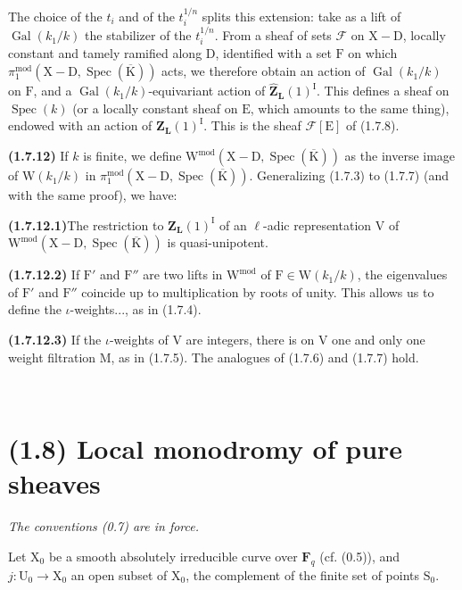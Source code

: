 \documentclass[11pt,leqno]{article}
\newcommand{\Page}[1]{\ifvmode\noindent\else\unskip\ \fi{\footnotesize\textcolor{gray}{[p.\,#1]}}\ \ignorespaces}
\begin{document}
The choice of the \(t_i\) and of the \(t_i^{1/n}\) splits this extension: take as a lift of \(\operatorname{Gal}(k_1/k)\) the stabilizer of the \(t_i^{1/n}\). From a sheaf of sets \(\mathscr{F}\) on \(\mathrm{X}-\mathrm{D}\), locally constant and tamely ramified along \(\mathrm{D}\), identified with a set \(\mathrm{F}\) on which \(\pi_1^{\mathrm{mod}}(\mathrm{X}-\mathrm{D},\operatorname{Spec}(\overline{\mathrm{K}}))\) acts, we therefore obtain an action of \(\operatorname{Gal}(k_1/k)\) on \(\mathrm{F}\), and a \(\operatorname{Gal}(k_1/k)\)-equivariant action of \(\widehat{\mathbf{Z}}_{\mathbf{L}}(1)^{\mathrm{I}}\). This defines a sheaf on \(\operatorname{Spec}(k)\) (or a locally constant sheaf on \(\mathrm{E}\), which amounts to the same thing), endowed with an action of \(\mathbf{Z}_{\mathbf{L}}(1)^{\mathrm{I}}\). This is the sheaf \(\mathscr{F}[\mathrm{E}]\) of (1.7.8).

\textbf{(1.7.12)} If \(k\) is finite, we define \(\mathrm{W}^{\mathrm{mod}}(\mathrm{X}-\mathrm{D},\operatorname{Spec}(\overline{\mathrm{K}}))\) as the inverse image of \(\mathrm{W}(k_1/k)\) in \(\pi_1^{\mathrm{mod}}(\mathrm{X}-\mathrm{D},\operatorname{Spec}(\overline{\mathrm{K}}))\). Generalizing (1.7.3) to (1.7.7) (and with the same proof), we have:

\textbf{(1.7.12.1)}The restriction to \(\mathbf{Z}_{\mathbf{L}}(1)^{\mathrm{I}}\) of an \(\ell\)-adic representation \(\mathrm{V}\) of \(\mathrm{W}^{\mathrm{mod}}(\mathrm{X}-\mathrm{D},\operatorname{Spec}(\overline{\mathrm{K}}))\) is quasi-unipotent.

\textbf{(1.7.12.2)} If \(\mathrm{F}'\) and \(\mathrm{F}''\) are two lifts in \(\mathrm{W}^{\mathrm{mod}}\) of \(\mathrm{F}\in\mathrm{W}(k_1/k)\), the eigenvalues of \(\mathrm{F}'\) and \(\mathrm{F}''\) coincide up to multiplication by roots of unity. This allows us to define the \(\iota\)-weights..., as in (1.7.4).

\textbf{(1.7.12.3)} If the \(\iota\)-weights of \(\mathrm{V}\) are integers, there is on \(\mathrm{V}\) one and only one weight filtration \(\mathrm{M}\), as in (1.7.5). The analogues of (1.7.6) and (1.7.7) hold.

\Page{175}
\section*{(1.8) Local monodromy of pure sheaves}

\textit{The conventions \textup{(0.7)} are in force.}

Let \(\mathrm{X}_0\) be a smooth absolutely irreducible curve over \(\mathbf{F}_q\) (cf. (0.5)), and \(j:\mathrm{U}_0\to\mathrm{X}_0\) an open subset of \(\mathrm{X}_0\), the complement of the finite set of points \(\mathrm{S}_0\).
\end{document}
